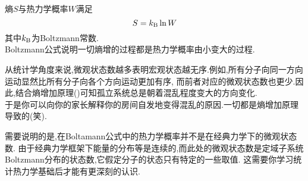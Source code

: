 \documentclass{ctexart}
\begin{document}
\begin{theorem}[3B.1.1 Boltzmann公式]
    熵$S$与热力学概率$W$满足
    \[S=k_\text B\ln W\]
    其中$k_\text B$为Boltzmann常数.\\
    Boltzmann公式说明一切熵增的过程都是热力学概率由小变大的过程.
\end{theorem}
从统计学角度来说,微观状态数越多表明宏观状态越无序.例如,所有分子向同一方向运动显然比所有分子向各个方向运动更加有序,%
而前者对应的微观状态数也更少.因此,结合熵增加原理()可知孤立系统总是朝着混乱程度变大的方向变化.\\
\indent 于是你可以向你的家长解释你的房间自发地变得混乱的原因.一切都是熵增加原理导致的(笑).
\begin{hint}
    需要说明的是,在Boltamann公式中的热力学概率并不是在经典力学下的微观状态数.%
    由于经典力学框架下能量的分布等是连续的,而此处的微观状态数是定域子系统Boltzmann分布的状态数,它假定分子的状态只有特定的一些取值.%
    这需要你学习统计热力学基础后才能有更深刻的认识.
\end{hint}
\end{document}
